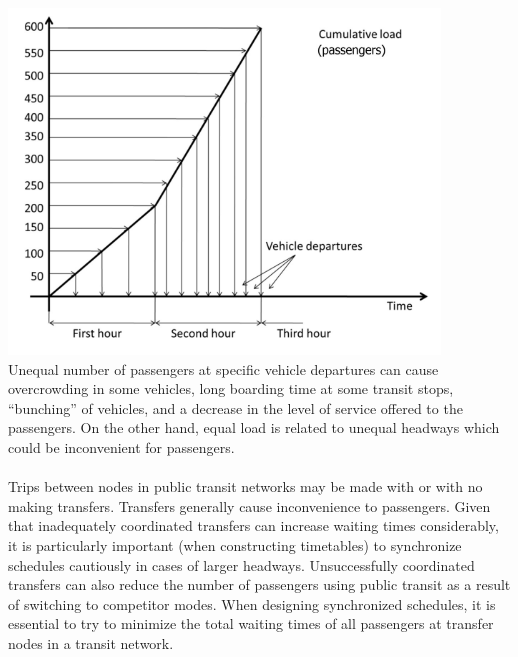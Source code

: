 \includegraphics{gfx/fig28.png}\\
Unequal number of passengers at specific vehicle departures can cause overcrowding in some vehicles, long boarding time at some transit stops, “bunching” of vehicles, and a decrease in the level of service offered to the passengers. On the other hand, equal load is related to unequal headways which could be inconvenient for passengers.\\\\
Trips between nodes in public transit networks may be made with or with no making transfers.
Transfers generally cause inconvenience to passengers. Given that inadequately coordinated transfers can increase waiting times considerably, it is particularly important (when constructing timetables) to synchronize schedules cautiously in cases of larger headways. Unsuccessfully coordinated transfers can also reduce the number of passengers using public transit as a result of switching to competitor modes. When designing synchronized schedules, it is essential to try to minimize the total waiting times of all passengers at transfer nodes in a transit network.
%
